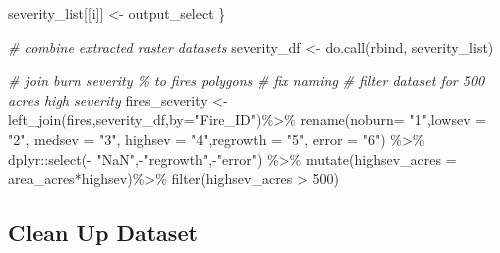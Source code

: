 \documentclass[
]{book}
\newenvironment{Shaded}{\begin{snugshade}}{\end{snugshade}}
\newcommand{\AttributeTok}[1]{\textcolor[rgb]{0.77,0.63,0.00}{#1}}
\newcommand{\CommentTok}[1]{\textcolor[rgb]{0.56,0.35,0.01}{\textit{#1}}}
\newcommand{\DecValTok}[1]{\textcolor[rgb]{0.00,0.00,0.81}{#1}}
\newcommand{\FunctionTok}[1]{\textcolor[rgb]{0.00,0.00,0.00}{#1}}
\newcommand{\NormalTok}[1]{#1}
\newcommand{\OtherTok}[1]{\textcolor[rgb]{0.56,0.35,0.01}{#1}}
\newcommand{\SpecialCharTok}[1]{\textcolor[rgb]{0.00,0.00,0.00}{#1}}
\newcommand{\StringTok}[1]{\textcolor[rgb]{0.31,0.60,0.02}{#1}}
\begin{document}
\begin{Shaded}
\begin{Highlighting}[]
\NormalTok{  severity\_list[[i]] }\OtherTok{\textless{}{-}}\NormalTok{ output\_select}
\NormalTok{\}}

\CommentTok{\# combine extracted raster datasets}
\NormalTok{severity\_df }\OtherTok{\textless{}{-}} \FunctionTok{do.call}\NormalTok{(rbind, severity\_list) }

\CommentTok{\# join burn severity \% to fires polygons}
\CommentTok{\# fix naming}
\CommentTok{\# filter dataset for 500 acres high severity}
\NormalTok{fires\_severity }\OtherTok{\textless{}{-}} \FunctionTok{left\_join}\NormalTok{(fires,severity\_df,}\AttributeTok{by=}\StringTok{"Fire\_ID"}\NormalTok{)}\SpecialCharTok{\%\textgreater{}\%} 
  \FunctionTok{rename}\NormalTok{(}\AttributeTok{noburn=} \StringTok{"1"}\NormalTok{,}\AttributeTok{lowsev =} \StringTok{"2"}\NormalTok{, }\AttributeTok{medsev =} \StringTok{"3"}\NormalTok{, }\AttributeTok{highsev =} \StringTok{"4"}\NormalTok{,}\AttributeTok{regrowth =} \StringTok{"5"}\NormalTok{, }\AttributeTok{error =} \StringTok{"6"}\NormalTok{) }\SpecialCharTok{\%\textgreater{}\%} 
\NormalTok{  dplyr}\SpecialCharTok{::}\FunctionTok{select}\NormalTok{(}\SpecialCharTok{{-}} \StringTok{"NaN"}\NormalTok{,}\SpecialCharTok{{-}}\StringTok{"regrowth"}\NormalTok{,}\SpecialCharTok{{-}}\StringTok{"error"}\NormalTok{) }\SpecialCharTok{\%\textgreater{}\%} 
  \FunctionTok{mutate}\NormalTok{(}\AttributeTok{highsev\_acres =}\NormalTok{ area\_acres}\SpecialCharTok{*}\NormalTok{highsev)}\SpecialCharTok{\%\textgreater{}\%} 
  \FunctionTok{filter}\NormalTok{(highsev\_acres }\SpecialCharTok{\textgreater{}} \DecValTok{500}\NormalTok{)}
\end{Highlighting}
\end{Shaded}

\hypertarget{clean-up-dataset}{%
\subsection{Clean Up Dataset}\label{clean-up-dataset}}
\end{document}
